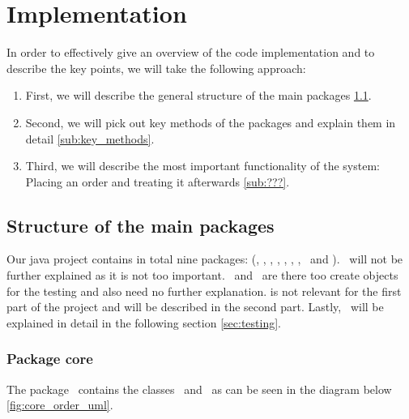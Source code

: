 \section{Implementation} %
\label{sec:implementation}


In order to effectively give an overview of the code implementation and to describe the key points, we will take the following approach: 

\begin{enumerate}
	
	\item First, we will describe the general structure of the main packages \ref{sub:structure_of_the_main_packages}.
	\item Second, we will pick out key methods of the packages and explain them in detail \ref{sub:key_methods}. 
	\item Third, we will describe the most important functionality of the system: Placing an order and treating it afterwards \ref{sub:???}. 
	
\end{enumerate}

\subsection{Structure of the main packages} %
\label{sub:structure_of_the_main_packages}

Our java project contains in total nine packages: (\core, \exceptions, \parsers, \policies, \restaurantSetup, \tests, \txtF, \userI~and \users). \exceptions~will not be further explained as it is not too important. \parsers~and \txtF~are there too create objects for the testing and also need no further explanation. \userI is not relevant for the first part of the project and will be described in the second part. Lastly, \tests~will be explained in detail in the following section \ref{sec:testing}.

\subsubsection{Package core} %
\label{ssub:core}

The package \core~contains the classes \Core~and \Order~as can be seen in the diagram below \ref{fig:core_order_uml}. 

